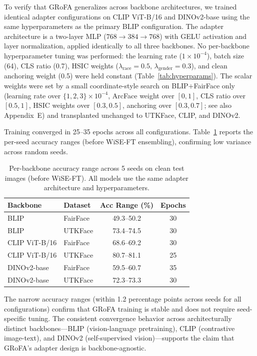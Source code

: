 To verify that GRoFA generalizes across backbone architectures, we trained identical adapter configurations on CLIP ViT-B/16 and DINOv2-base using the same hyperparameters as the primary BLIP configuration.
The adapter architecture is a two-layer MLP ($768 \to 384 \to 768$) with GELU activation and layer normalization, applied identically to all three backbones.
No per-backbone hyperparameter tuning was performed: the learning rate ($1{\times}10^{-4}$), batch size (64), CLS ratio (0.7), HSIC weights ($\lambda_{\text{race}} = 0.5$, $\lambda_{\text{gender}} = 0.3$), and clean anchoring weight (0.5) were held constant (Table~\ref{tab:hyperparams}).
The scalar weights were set by a small coordinate-style search on BLIP$+$FairFace only (learning rate over $\{1,2,3\}{\times}10^{-4}$, ArcFace weight over $[0,1]$, CLS ratio over $[0.5,1]$, HSIC weights over $[0.3,0.5]$, anchoring over $[0.3,0.7]$; see also Appendix~E) and transplanted unchanged to UTKFace, CLIP, and DINOv2.

Training converged in 25--35 epochs across all configurations.
Table~\ref{tab:backbone_seeds} reports the per-seed accuracy ranges (before WiSE-FT ensembling), confirming low variance across random seeds.

\begin{table}[htbp]
\centering
\caption{Per-backbone accuracy range across 5 seeds on clean test images (before WiSE-FT). All models use the same adapter architecture and hyperparameters.}
\label{tab:backbone_seeds}
\small
\begin{tabular}{llcc}
\toprule
Backbone & Dataset & Acc Range (\%) & Epochs \\
\midrule
BLIP & FairFace & 49.3--50.2 & 30 \\
BLIP & UTKFace & 73.4--74.5 & 30 \\
CLIP ViT-B/16 & FairFace & 68.6--69.2 & 30 \\
CLIP ViT-B/16 & UTKFace & 80.7--81.1 & 25 \\
DINOv2-base & FairFace & 59.5--60.7 & 35 \\
DINOv2-base & UTKFace & 72.3--73.3 & 30 \\
\bottomrule
\end{tabular}
\end{table}

The narrow accuracy ranges (within 1.2 percentage points across seeds for all configurations) confirm that GRoFA training is stable and does not require seed-specific tuning.
The consistent convergence behavior across architecturally distinct backbones---BLIP (vision-language pretraining), CLIP (contrastive image-text), and DINOv2 (self-supervised vision)---supports the claim that GRoFA's adapter design is backbone-agnostic.


